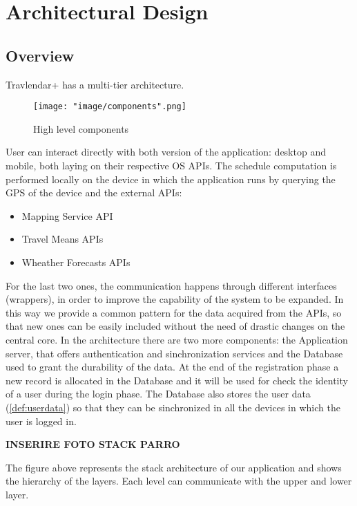 \chapter{Architectural Design}

\section{Overview}

Travlendar+ has a multi-tier architecture.

\begin{figure}[H]
\begin{center}
\texttt{[image: "image/components".png]}
\caption{High level components}
\end{center}
\end{figure}
 
User can interact directly with both version of the application: desktop and mobile, both laying on their respective OS APIs. The schedule computation is performed locally on the device in which the application runs by querying the GPS of the device and the external APIs:

\begin{itemize}
\item Mapping Service API
\item Travel Means APIs
\item Wheather Forecasts APIs
\end{itemize}

For the last two ones, the communication happens through different interfaces (wrappers), in order to improve the capability of the system to be expanded. In this way we provide a common pattern for the data acquired from the APIs, so that new ones can be easily included without the need of drastic changes on the central core.
In the architecture there are two more components: the Application server, that offers authentication and sinchronization services and the Database used to grant the durability of the data. At the end of the registration phase a new record is allocated in the Database and it will be used for check the identity of a user during the login phase. The Database also stores the user data (\ref{def:userdata}) so that they can be sinchronized in all the devices in which the user is logged in. 

\textbf{INSERIRE FOTO STACK PARRO}

The figure above represents the stack architecture of our application and shows the hierarchy of the layers. Each level can communicate with the upper and lower layer.

